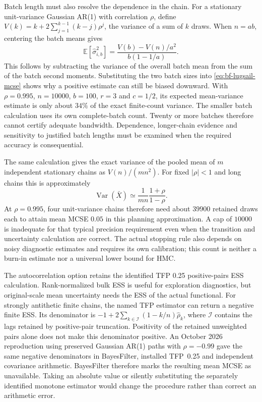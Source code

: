 Batch length must also resolve the dependence in the chain. For a stationary
unit-variance Gaussian AR(1) with correlation $\rho$, define
$V(k)=k+2\sum_{j=1}^{k-1}(k-j)\rho^j$, the variance of a sum of $k$ draws.
When $n=ab$, centering the batch means gives
\begin{equation}
 \mathbb{E}[\widehat\sigma_{i,b}^2]
 =\frac{V(b)-V(n)/a^2}{b(1-1/a)}.
\end{equation}
This follows by subtracting the variance of the overall batch mean from the
sum of the batch second moments. Substituting the two batch sizes into
\eqref{eq:bf-lugsail-mcse} shows why a positive estimate can still be biased
downward. With $\rho=0.995$, $n=10000$, $b=100$, $r=3$ and $c=1/2$, its expected
mean-variance estimate is only about $34\%$ of the exact finite-count variance.
The smaller batch calculation uses its own complete-batch count. Twenty or
more batches therefore cannot certify adequate bandwidth. Dependence,
longer-chain evidence and sensitivity to justified batch lengths must be
examined when the required accuracy is consequential.

The same calculation gives the exact variance of the pooled mean of $m$
independent stationary chains as $V(n)/(mn^2)$. For fixed $|\rho|<1$ and long
chains this is approximately
\begin{equation}
 \operatorname{Var}(\bar X) \simeq
 \frac{1}{mn}\frac{1+\rho}{1-\rho}.
\end{equation}
At $\rho=0.995$, four unit-variance chains therefore need about $39900$
retained draws each to attain mean MCSE $0.05$ in this planning approximation.
A cap of $10000$ is inadequate for that typical precision requirement even
when the transition and uncertainty calculation are correct. The actual
stopping rule also depends on noisy diagnostic estimates and requires its own
calibration; this count is neither a burn-in estimate nor a universal lower
bound for HMC.

The autocorrelation option retains the identified TFP 0.25 positive-pairs ESS
calculation. Rank-normalized bulk ESS is useful for exploration diagnostics,
but original-scale mean uncertainty needs the ESS of the actual functional.
For strongly antithetic finite chains, the named TFP estimator can return a
negative finite ESS. Its denominator is
$-1+2\sum_{k\in\mathcal I}(1-k/n)\widehat\rho_k$, where $\mathcal I$
contains the lags retained by positive-pair truncation. Positivity of the
retained unweighted pairs alone does not make this denominator positive.
An October 2026 reproduction using preserved Gaussian AR(1) paths with
$\rho=-0.99$ gave the same negative denominators in BayesFilter, installed
TFP~0.25 and independent covariance arithmetic. BayesFilter therefore marks
the resulting mean MCSE as unavailable. Taking an absolute value or silently
substituting the separately identified monotone estimator would change the
procedure rather than correct an arithmetic error.

